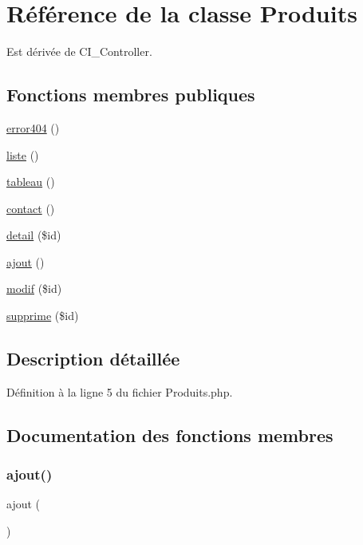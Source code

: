 \hypertarget{class_produits}{}\section{Référence de la classe Produits}
\label{class_produits}


Est dérivée de C\+I\+\_\+\+Controller.

\subsection*{Fonctions membres publiques}
\begin{DoxyCompactItemize}
\item 
\mbox{\hyperlink{class_produits_a87a4b3da34150d62eb414e41257e59c7}{error404}} ()
\item 
\mbox{\hyperlink{class_produits_aa9d6c9e344104cf118d31bd0d93c3bcf}{liste}} ()
\item 
\mbox{\hyperlink{class_produits_a19423df8485a23548fa7d8a043438261}{tableau}} ()
\item 
\mbox{\hyperlink{class_produits_a9f5d7f60267d2c2712109d4bc2937612}{contact}} ()
\item 
\mbox{\hyperlink{class_produits_ae0f8b9d7c69282ded611d8a2a9a43217}{detail}} (\$id)
\item 
\mbox{\hyperlink{class_produits_a001d6e561e666bd915d83ba9103bea69}{ajout}} ()
\item 
\mbox{\hyperlink{class_produits_a295587c8d90d190e24c17e5101cbf144}{modif}} (\$id)
\item 
\mbox{\hyperlink{class_produits_a8a2f1b91be82fb6ce2bd53b59cc00e69}{supprime}} (\$id)
\end{DoxyCompactItemize}


\subsection{Description détaillée}


Définition à la ligne 5 du fichier Produits.\+php.



\subsection{Documentation des fonctions membres}
\mbox{\label{class_produits_a001d6e561e666bd915d83ba9103bea69}} 
\subsubsection{\texorpdfstring{ajout()}{ajout()}}
{\footnotesize\ttfamily ajout (\begin{DoxyParamCaption}{ }\end{DoxyParamCaption})}



